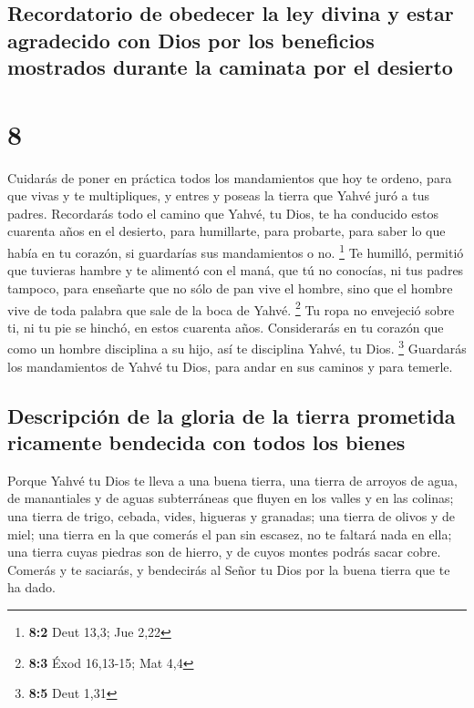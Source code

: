 \hypertarget{recordatorio-de-obedecer-la-ley-divina-y-estar-agradecido-con-dios-por-los-beneficios-mostrados-durante-la-caminata-por-el-desierto}{%
\subsection{Recordatorio de obedecer la ley divina y estar agradecido
con Dios por los beneficios mostrados durante la caminata por el
desierto}\label{recordatorio-de-obedecer-la-ley-divina-y-estar-agradecido-con-dios-por-los-beneficios-mostrados-durante-la-caminata-por-el-desierto}}

\hypertarget{section-7}{%
\section{8}\label{section-7}}

 Cuidarás de poner en práctica todos los mandamientos que
hoy te ordeno, para que vivas y te multipliques, y entres y poseas la
tierra que Yahvé juró a tus padres.  Recordarás todo el
camino que Yahvé, tu Dios, te ha conducido estos cuarenta años en el
desierto, para humillarte, para probarte, para saber lo que había en tu
corazón, si guardarías sus mandamientos o no. \footnote{\textbf{8:2}
  Deut 13,3; Jue 2,22}  Te humilló, permitió que tuvieras
hambre y te alimentó con el maná, que tú no conocías, ni tus padres
tampoco, para enseñarte que no sólo de pan vive el hombre, sino que el
hombre vive de toda palabra que sale de la boca de Yahvé. \footnote{\textbf{8:3}
  Éxod 16,13-15; Mat 4,4}  Tu ropa no envejeció sobre ti,
ni tu pie se hinchó, en estos cuarenta años.  Considerarás
en tu corazón que como un hombre disciplina a su hijo, así te disciplina
Yahvé, tu Dios. \footnote{\textbf{8:5} Deut 1,31} 
Guardarás los mandamientos de Yahvé tu Dios, para andar en sus caminos y
para temerle.

\hypertarget{descripciuxf3n-de-la-gloria-de-la-tierra-prometida-ricamente-bendecida-con-todos-los-bienes}{%
\subsection{Descripción de la gloria de la tierra prometida ricamente
bendecida con todos los
bienes}\label{descripciuxf3n-de-la-gloria-de-la-tierra-prometida-ricamente-bendecida-con-todos-los-bienes}}

 Porque Yahvé tu Dios te lleva a una buena tierra, una
tierra de arroyos de agua, de manantiales y de aguas subterráneas que
fluyen en los valles y en las colinas;  una tierra de
trigo, cebada, vides, higueras y granadas; una tierra de olivos y de
miel;  una tierra en la que comerás el pan sin escasez, no
te faltará nada en ella; una tierra cuyas piedras son de hierro, y de
cuyos montes podrás sacar cobre.  Comerás y te saciarás,
y bendecirás al Señor tu Dios por la buena tierra que te ha dado.


